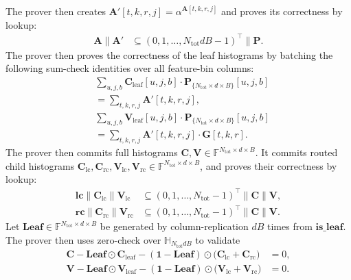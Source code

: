 The prover then creates $\mathbf{A}'[t,k,r,j] = \alpha^{\mathbf{A}[t,k,r,j]}$ and proves its correctness by lookup:
\begin{align}
    \mathbf{A}\|\mathbf{A}'
    &\subseteq
    (0, 1, \dots, N_{\mathrm{tot}}dB-1)^\top\|
    \mathbf{P}.
\end{align}
The prover then
proves the correctness of the leaf histograms by batching the following
sum-check identities over all feature-bin columns:
\begin{align}
    &\sum_{u, j, b}
    \mathbf{C}_{\mathrm{leaf}}[u, j, b]\cdot \mathbf{P}_{\{N_{\mathrm{tot}}\times d\times B\}}[u, j, b]\nonumber\\
    &=
    \sum_{t,k,r,j}\mathbf{A}'[t,k,r,j],\\
    &\sum_{u, j, b}
    \mathbf{V}_{\mathrm{leaf}}[u, j, b]\cdot \mathbf{P}_{\{N_{\mathrm{tot}}\times d\times B\}}[u, j, b]\nonumber\\
    &=
    \sum_{t,k,r,j}\mathbf{A}'[t,k,r,j]\cdot \mathbf{G}[t,k,r].
\end{align}
The prover then commits full histograms
$\mathbf{C},\mathbf{V}
\in\mathbb{F}^{N_{\mathrm{tot}}\times d\times B}$.
It commits routed child histograms
$\mathbf{C}_{\mathrm{lc}},\mathbf{C}_{\mathrm{rc}},
\mathbf{V}_{\mathrm{lc}},\mathbf{V}_{\mathrm{rc}}
\in\mathbb{F}^{N_{\mathrm{tot}}\times d\times B}$,
and proves their correctness by lookup:
\begin{align}
    \mathbf{lc}\|\mathbf{C}_{\mathrm{lc}}\|\mathbf{V}_{\mathrm{lc}}
    &\subseteq
    (0,1,\dots,N_{\mathrm{tot}}-1)^\top\|
    \mathbf{C}\|\mathbf{V},\\
    \mathbf{rc}\|\mathbf{C}_{\mathrm{rc}}\|\mathbf{V}_{\mathrm{rc}}
    &\subseteq
    (0,1,\dots,N_{\mathrm{tot}}-1)^\top\|
    \mathbf{C}\|\mathbf{V}.
\end{align}
Let $\mathbf{Leaf}\in\mathbb{F}^{N_{\mathrm{tot}}\times d\times B}$
be generated by column-replication $dB$ times from $\mathbf{is\_leaf}$.
The prover then uses zero-check over $\mathbb{H}_{N_{\mathrm{tot}}dB}$ to validate
\begin{align}
    \mathbf{C}
    -
    \mathbf{Leaf}\odot\mathbf{C}_{\mathrm{leaf}}
    -(\mathbf{1}-\mathbf{Leaf})\odot
    \bigl(\mathbf{C}_{\mathrm{lc}}+\mathbf{C}_{\mathrm{rc}}\bigr) &= 0,\\
    \mathbf{V}
    -
    \mathbf{Leaf}\odot\mathbf{V}_{\mathrm{leaf}}
    -(\mathbf{1}-\mathbf{Leaf})\odot
    \bigl(\mathbf{V}_{\mathrm{lc}}+\mathbf{V}_{\mathrm{rc}}\bigr) &= 0.
\end{align}

